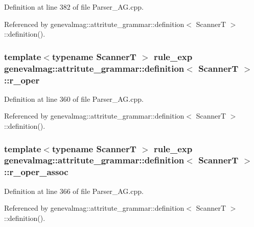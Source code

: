 Definition at line 382 of file Parser\_\-AG.cpp.



Referenced by genevalmag::attritute\_\-grammar::definition$<$ ScannerT $>$::definition().

\hypertarget{structgenevalmag_1_1attritute__grammar_1_1definition_a00bb751588780a4499c53c5bc282785b}{
\subsubsection[{r\_\-oper}]{\setlength{\rightskip}{0pt plus 5cm}template$<$typename ScannerT $>$ {\bf rule\_\-exp} {\bf genevalmag::attritute\_\-grammar::definition}$<$ ScannerT $>$::{\bf r\_\-oper}}}
\label{structgenevalmag_1_1attritute__grammar_1_1definition_a00bb751588780a4499c53c5bc282785b}


Definition at line 360 of file Parser\_\-AG.cpp.



Referenced by genevalmag::attritute\_\-grammar::definition$<$ ScannerT $>$::definition().

\hypertarget{structgenevalmag_1_1attritute__grammar_1_1definition_a7e427631cb39597826061eae16544d46}{
\subsubsection[{r\_\-oper\_\-assoc}]{\setlength{\rightskip}{0pt plus 5cm}template$<$typename ScannerT $>$ {\bf rule\_\-exp} {\bf genevalmag::attritute\_\-grammar::definition}$<$ ScannerT $>$::{\bf r\_\-oper\_\-assoc}}}
\label{structgenevalmag_1_1attritute__grammar_1_1definition_a7e427631cb39597826061eae16544d46}


Definition at line 366 of file Parser\_\-AG.cpp.



Referenced by genevalmag::attritute\_\-grammar::definition$<$ ScannerT $>$::definition().

